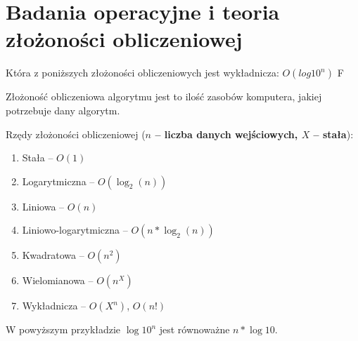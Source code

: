 \chapter{Badania operacyjne i teoria złożoności obliczeniowej}
\PartialToc




\answer
{Która z poniższych złożoności obliczeniowych jest wykładnicza:}
{$O(log 10^n)$}
{F}
{}
{Złożoność obliczeniowa algorytmu jest to ilość zasobów komputera, jakiej potrzebuje dany algorytm. 

Rzędy złożoności obliczeniowej (\textbf{$n$ -- liczba danych wejściowych, $X$ -- stała}):
\begin{enumerate}
\item {Stała -- $O(1)$}
\item {Logarytmiczna -- $O(\log_2(n))$}
\item {Liniowa -- $O(n)$}
\item {Liniowo-logarytmiczna -- $O(n*\log_2(n))$}
\item {Kwadratowa -- $O(n^2)$}
\item {Wielomianowa -- $O(n^X)$}
\item {Wykładnicza -- $O(X^n)$, $O(n!)$}
\end{enumerate}

W powyższym przykładzie $\log 10^n$ jest równoważne $n*\log 10$.
}





